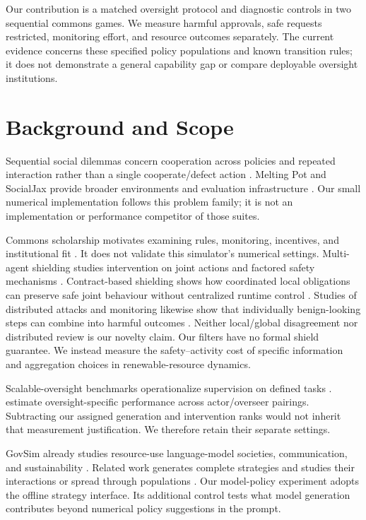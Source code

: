 \documentclass[10pt]{article}
\begin{document}
Our contribution is a matched oversight protocol and diagnostic controls in two sequential commons games. We measure harmful approvals, safe requests restricted, monitoring effort, and resource outcomes separately. The current evidence concerns these specified policy populations and known transition rules; it does not demonstrate a general capability gap or compare deployable oversight institutions.

\section{Background and Scope}
Sequential social dilemmas concern cooperation across policies and repeated interaction rather than a single cooperate/defect action \citep{leibo2017sequential}. Melting Pot and SocialJax provide broader environments and evaluation infrastructure \citep{agapiou2022meltingpot,guo2025socialjax}. Our small numerical implementation follows this problem family; it is not an implementation or performance competitor of those suites.

Commons scholarship motivates examining rules, monitoring, incentives, and institutional fit \citep{ostrom1990governing}. It does not validate this simulator's numerical settings. Multi-agent shielding studies intervention on joint actions and factored safety mechanisms \citep{elsayedaly2021shielding}. Contract-based shielding shows how coordinated local obligations can preserve safe joint behaviour without centralized runtime control \citep{adalat2026contracts}. Studies of distributed attacks and monitoring likewise show that individually benign-looking steps can combine into harmful outcomes \citep{hu2026compositional,makins2026multiagent}. Neither local/global disagreement nor distributed review is our novelty claim. Our filters have no formal shield guarantee. We instead measure the safety--activity cost of specific information and aggregation choices in renewable-resource dynamics.

Scalable-oversight benchmarks operationalize supervision on defined tasks \citep{bowman2022scalable,sudhir2025benchmark}. \citet{engels2025scaling} estimate oversight-specific performance across actor/overseer pairings. Subtracting our assigned generation and intervention ranks would not inherit that measurement justification. We therefore retain their separate settings.

GovSim already studies resource-use language-model societies, communication, and sustainability \citep{piatti2024govsim}. Related work generates complete strategies and studies their interactions or spread through populations \citep{willis2025cooperate,willis2026hundreds}. Our model-policy experiment adopts the offline strategy interface. Its additional control tests what model generation contributes beyond numerical policy suggestions in the prompt.
\end{document}
